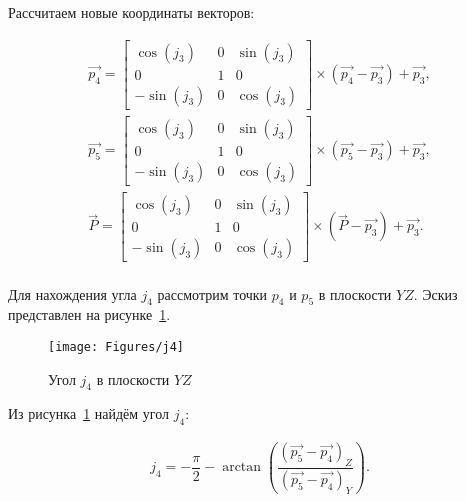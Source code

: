 Рассчитаем новые координаты векторов:

\begin{gather*}
    \overrightarrow{p_4} =
    \begin{bmatrix}
        \cos(j_3)  & 0 & \sin(j_3) \\
        0          & 1 & 0         \\
        -\sin(j_3) & 0 & \cos(j_3)
    \end{bmatrix} \times \left( \overrightarrow{p_4} - \overrightarrow{p_3} \right) + \overrightarrow{p_3}, \\
    \overrightarrow{p_5} =
    \begin{bmatrix}
        \cos(j_3)  & 0 & \sin(j_3) \\
        0          & 1 & 0         \\
        -\sin(j_3) & 0 & \cos(j_3)
    \end{bmatrix} \times \left( \overrightarrow{p_5} - \overrightarrow{p_3} \right) + \overrightarrow{p_3}, \\
    \overrightarrow{P} =
    \begin{bmatrix}
        \cos(j_3)  & 0 & \sin(j_3) \\
        0          & 1 & 0         \\
        -\sin(j_3) & 0 & \cos(j_3)
    \end{bmatrix} \times \left( \overrightarrow{P} - \overrightarrow{p_3} \right) + \overrightarrow{p_3}.
\end{gather*} \\

Для нахождения угла $j_4$ рассмотрим точки $p_4$ и $p_5$ в плоскости $YZ$.
Эскиз представлен на рисунке~\ref{fig:ikp:j4}.

\begin{figure}[H]
    \centering
    \vspace{14pt}
    \texttt{[image: Figures/j4]}
    \caption{Угол $j_4$ в плоскости $YZ$}
    \label{fig:ikp:j4}
\end{figure}

Из рисунка~\ref{fig:ikp:j4} найдём угол $j_4$:

\begin{gather*}
    j_4 = -\dfrac{\pi}{2} - \arctan \left( \dfrac
    {\left( \overrightarrow{p_5} - \overrightarrow{p_4} \right)_Z}
    {\left( \overrightarrow{p_5} - \overrightarrow{p_4} \right)_Y} \right).
\end{gather*} \\

